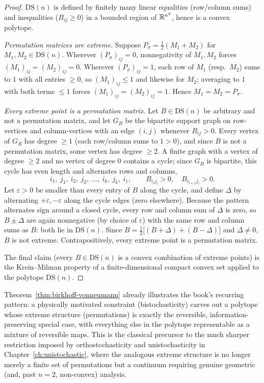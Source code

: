 \begin{proof}
$\mathrm{DS}(n)$ is defined by finitely many linear equalities (row/column
sums) and inequalities ($B_{ij}\ge0$) in a bounded region of $\mathbb{R}^{n^2}$, hence
is a convex polytope.

\emph{Permutation matrices are extreme.} Suppose $P_\sigma = \tfrac12(M_1+M_2)$
for $M_1,M_2 \in \mathrm{DS}(n)$. Wherever $(P_\sigma)_{ij}=0$, nonnegativity of
$M_1,M_2$ forces $(M_1)_{ij}=(M_2)_{ij}=0$. Wherever $(P_\sigma)_{ij}=1$, each
row of $M_1$ (resp.\ $M_2$) sums to $1$ with all entries $\ge0$, so
$(M_1)_{ij}\le1$ and likewise for $M_2$; averaging to $1$ with both terms
$\le1$ forces $(M_1)_{ij}=(M_2)_{ij}=1$. Hence $M_1=M_2=P_\sigma$.

\emph{Every extreme point is a permutation matrix.} Let $B \in \mathrm{DS}(n)$
be arbitrary and not a permutation matrix, and let $G_B$ be the bipartite
support graph on row-vertices and column-vertices with an edge $(i,j)$
whenever $B_{ij}>0$. Every vertex of $G_B$ has degree $\ge1$ (each row/column
sums to $1>0$), and since $B$ is not a permutation matrix, some vertex has
degree $\ge2$. A finite graph with a vertex of degree $\ge2$ and no vertex of
degree $0$ contains a cycle; since $G_B$ is bipartite, this cycle has even
length and alternates rows and columns,
\begin{equation}
i_1,\ j_1,\ i_2,\ j_2,\ \dots,\ i_k,\ j_k,\ i_1, \qquad
B_{i_l j_l} > 0, \quad B_{i_{l+1} j_l} > 0.
\end{equation}
Let $\varepsilon > 0$ be smaller than every entry of $B$ along the cycle, and
define $\Delta$ by alternating $+\varepsilon,-\varepsilon$ along the cycle
edges (zero elsewhere). Because the pattern alternates sign around a closed
cycle, every row and column sum of $\Delta$ is zero, so $B \pm \Delta$ are
again nonnegative (by choice of $\varepsilon$) with the same row and column
sums as $B$: both lie in $\mathrm{DS}(n)$. Since $B = \tfrac12\big[(B+\Delta) +
(B-\Delta)\big]$ and $\Delta \neq 0$, $B$ is not extreme. Contrapositively,
every extreme point is a permutation matrix.

The final claim (every $B \in \mathrm{DS}(n)$ is a convex combination of
extreme points) is the Krein--Milman property of a finite-dimensional compact
convex set applied to the polytope $\mathrm{DS}(n)$.
\end{proof}

\begin{remark}
Theorem~\ref{thm:birkhoff-vonneumann} already illustrates the book's recurring
pattern: a physically motivated constraint (bistochasticity) carves out a
polytope whose extreme structure (permutations) is exactly the reversible,
information-preserving special case, with everything else in the polytope
representable as a mixture of reversible maps. This is the classical precursor
to the much sharper restriction imposed by orthostochasticity and
unistochasticity in Chapter~\ref{ch:unistochastic}, where the analogous extreme
structure is no longer merely a finite set of permutations but a continuum
requiring genuine geometric (and, past $n=2$, non-convex) analysis.
\end{remark}

